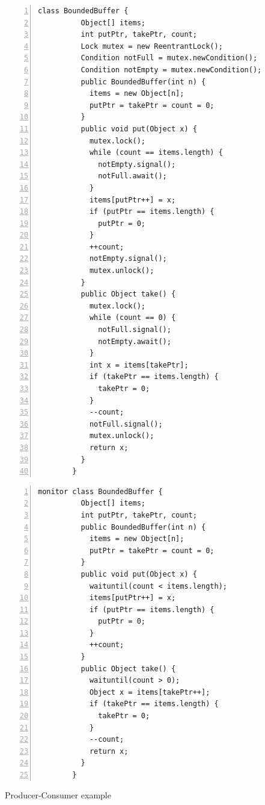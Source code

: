 \documentclass[preprint]{sigplanconf}
\begin{document}
\begin{figure}[ht!]
\begin{multicols}{2}
    \begin{Verbatim}[fontsize=\footnotesize,gobble=8,frame=topline,
            framesep=5mm,numbers=left,numbersep=2pt,
            label=\fbox{\small\emph{Explicit-Signal Bounded Buffer}}]
        class BoundedBuffer {
          Object[] items;  
          int putPtr, takePtr, count;
          Lock mutex = new ReentrantLock();
          Condition notFull = mutex.newCondition();
          Condition notEmpty = mutex.newCondition();
          public BoundedBuffer(int n) {
            items = new Object[n];
            putPtr = takePtr = count = 0;
          }
          public void put(Object x) {
            mutex.lock();
            while (count == items.length) {
              notEmpty.signal();
              notFull.await();
            }
            items[putPtr++] = x;
            if (putPtr == items.length) {
              putPtr = 0;
            }
            ++count;
            notEmpty.signal();
            mutex.unlock();
          }
          public Object take() {
            mutex.lock();
            while (count == 0) {
              notFull.signal();
              notEmpty.await();
            }
            int x = items[takePtr];
            if (takePtr == items.length) {
              takePtr = 0;
            }
            --count;
            notFull.signal();
            mutex.unlock();
            return x;
          }
        }
    \end{Verbatim}
    \begin{Verbatim}[fontsize=\footnotesize,gobble=8,frame=lines,framesep=5mm,
            numbers=left,numbersep=2pt,
            label=\fbox{\small\emph{Implicit-Signal Bounded Buffer}}]
        monitor class BoundedBuffer { 
          Object[] items; 
          int putPtr, takePtr, count; 
          public BoundedBuffer(int n) {
            items = new Object[n];
            putPtr = takePtr = count = 0;
          }
          public void put(Object x) { 
            waituntil(count < items.length); 
            items[putPtr++] = x; 
            if (putPtr == items.length) { 
              putPtr = 0; 
            } 
            ++count; 
          } 
          public Object take() { 
            waituntil(count > 0); 
            Object x = items[takePtr++]; 
            if (takePtr == items.length) { 
              takePtr = 0; 
            }
            --count;
            return x;
          }
        }
    \end{Verbatim}
\end{multicols}
  \caption{Producer-Consumer example}
  \label{fig:bb_exp}
\end{figure}
\end{document}
